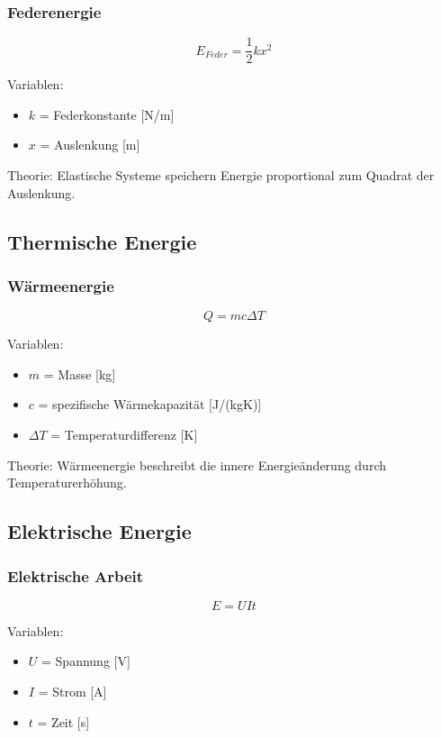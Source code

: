 \subsubsection{Federenergie}

\[
E_{Feder} = \frac{1}{2} k x^2
\]

Variablen:
\begin{itemize}
\item $k$ = Federkonstante [N/m]
\item $x$ = Auslenkung [m]
\end{itemize}

Theorie:
Elastische Systeme speichern Energie proportional zum Quadrat der Auslenkung.

\subsection{Thermische Energie}

\subsubsection{Wärmeenergie}

\[
Q = m c \Delta T
\]

Variablen:
\begin{itemize}
\item $m$ = Masse [kg]
\item $c$ = spezifische Wärmekapazität [J/(kgK)]
\item $\Delta T$ = Temperaturdifferenz [K]
\end{itemize}

Theorie:
Wärmeenergie beschreibt die innere Energieänderung durch Temperaturerhöhung.

\subsection{Elektrische Energie}

\subsubsection{Elektrische Arbeit}

\[
E = U I t
\]

Variablen:
\begin{itemize}
\item $U$ = Spannung [V]
\item $I$ = Strom [A]
\item $t$ = Zeit [s]
\end{itemize}

